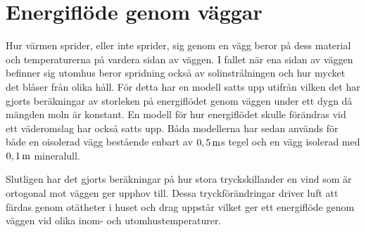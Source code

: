 \section{Energiflöde genom väggar}

Hur värmen sprider, eller inte sprider, sig genom en vägg beror på dess material och temperaturerna på vardera sidan av väggen. I fallet när ena sidan av väggen befinner sig utomhus beror spridning också av solinstrålningen och hur mycket det blåser från olika håll. För detta har en modell satts upp utifrån vilken det har gjorts beräkningar av storleken på energiflödet genom väggen under ett dygn då mängden moln är konstant. En modell för hur energiflödet skulle förändras vid ett väderomslag har också satts upp. Båda modellerna har sedan används för både en oisolerad vägg bestående enbart av $\unit[0,5]{m}$s tegel och en vägg isolerad med $\unit[0,1]{m}$ mineralull.

Slutligen har det gjorts beräkningar på hur stora tryckskillander en vind som är ortogonal mot väggen ger upphov till. Dessa tryckförändringar driver luft att färdas genom otätheter i huset och drag uppstår vilket ger ett energiflöde genom väggen vid olika inom- och utomhustemperaturer.





% 


